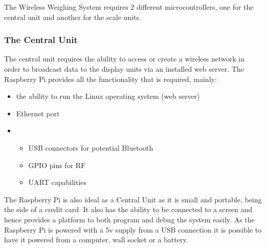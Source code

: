 The Wireless Weighing System requires 2 different microcontrollers, one for the central unit and another for the scale units. 
\subsubsection{The Central Unit}
The central unit requires the ability to access or create a wireless network in order to broadcast data to the display units via an installed web server. The Raspberry Pi provides all the functionality that is required, mainly:
	\begin{itemize}
		\item the ability to run the Linux operating system (web server)
		\item Ethernet port
		\item \begin{itemize} networking options
			\item USB connectors for potential Bluetooth
			\item GPIO pins for RF
			\item UART capabilities
			\end{itemize}
	\end{itemize}
The Raspberry Pi is also ideal as a Central Unit as it is small and portable, being the side of a credit card. It also has the ability to be connected to a screen and hence provides a platform to both program and debug the system easily. As the Raspberry Pi is powered with a 5v supply from a USB connection it is possible to have it powered from a computer, wall socket or a battery.

